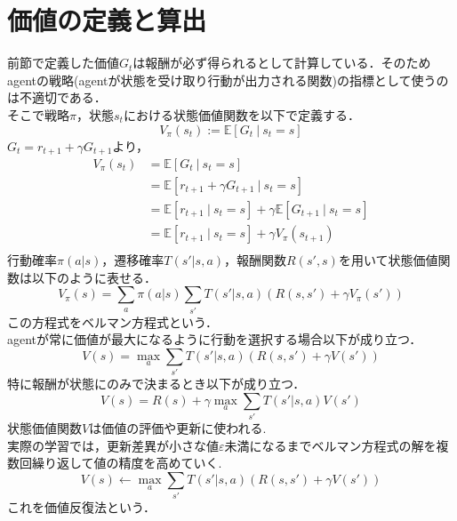 \documentclass[a4paper,12pt]{jsreport}
\theoremstyle{definition}
\begin{document}
\section{価値の定義と算出}
前節で定義した価値$G_t$は報酬が必ず得られるとして計算している．そのためagentの戦略(agentが状態を受け取り行動が出力される関数)の指標として使うのは不適切である．\\
そこで戦略$\pi$，状態$s_t$における状態価値関数を以下で定義する．
\begin{equation}
    V_\pi(s_t):=\mathbb{E}[G_t\ |\ s_t=s]
\end{equation}
$G_t=r_{t+1}+\gamma G_{t+1}$より，
\begin{align}
    V_\pi(s_t)&=\mathbb{E}[G_t\ |\ s_t=s]\\
    &=\mathbb{E}[r_{t+1}+\gamma G_{t+1}\ |\ s_t=s]\\
    &=\mathbb{E}[r_{t+1}\ |\ s_t=s]+\gamma\mathbb{E}[G_{t+1}\ |\ s_t=s]\\
    &=\mathbb{E}[r_{t+1}\ |\ s_t=s]+\gamma V_\pi (s_{t+1})\\
\end{align}
行動確率$\pi(a|s)$，遷移確率$T(s'|s,a)$，報酬関数$R(s',s)$を用いて状態価値関数は以下のように表せる．
\begin{equation}
    V_\pi(s)=\sum_a\pi(a|s)\sum_{s'}T(s'|s,a)(R(s,s')+\gamma V_\pi(s'))
\end{equation}
この方程式をベルマン方程式という．\\
agentが常に価値が最大になるように行動を選択する場合以下が成り立つ．
\begin{equation}
    V(s)=\max_a\sum_{s'}T(s'|s,a)(R(s,s')+\gamma V(s'))
\end{equation}
特に報酬が状態にのみで決まるとき以下が成り立つ．
\begin{equation}
    V(s)=R(s)+\gamma\max_a\sum_{s'}T(s'|s,a)V(s')
\end{equation}
状態価値関数$V$は価値の評価や更新に使われる.\\
実際の学習では，更新差異が小さな値$\varepsilon$未満になるまでベルマン方程式の解を複数回繰り返して値の精度を高めていく.
\begin{equation}
    V(s)\leftarrow\max_a\sum_{s'}T(s'|s,a)(R(s,s')+\gamma V(s'))
\end{equation}
これを価値反復法という．
\end{document}
